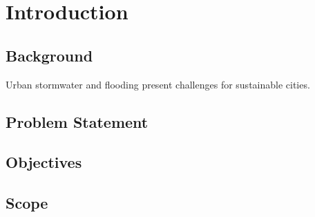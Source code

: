 \chapter{Introduction}

\section{Background}
Urban stormwater and flooding present challenges
for sustainable cities.

\section{Problem Statement}

\section{Objectives}

\section{Scope}
